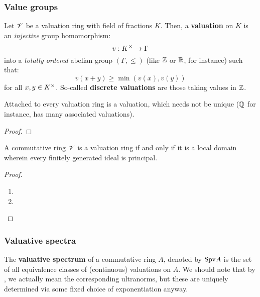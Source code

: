             \subsubsection{Value groups}
                \begin{definition}[Valuations] \label{def: valuations}
                    Let $\mathscr{V}$ be a valuation ring with field of fractions $K$. Then, a \textbf{valuation} on $K$ is an \textit{injective} group homomorphism:
                        $$v: K^{\x} \to \Gamma$$
                    into a \textit{totally ordered} abelian group $(\Gamma, \leq)$ (like $\mathbb{Z}$ or $\mathbb{R}$, for instance) such that:
                        $$v(x + y) \geq \min(v(x), v(y))$$
                    for all $x, y \in K^{\x}$. So-called \textbf{discrete valuations} are those taking values in $\mathbb{Z}$. 
                \end{definition}
                
                \begin{lemma}
                    Attached to every valuation ring is a valuation, which needs not be unique ($\mathbb{Q}$ for instance, has many associated valuations). 
                \end{lemma}
                    \begin{proof}
                        
                    \end{proof}
                \begin{theorem} \label{theorem: principality_and_locality_of_valuation rings}
                    A commutative ring $\mathscr{V}$ is a valuation ring if and only if it is a local domain wherein every finitely generated ideal is principal.
                \end{theorem}
                    \begin{proof}
                        \noindent
                        \begin{enumerate}
                            \item  
                            \item 
                        \end{enumerate}
                    \end{proof}
                    
            \subsubsection{Valuative spectra}
                \begin{definition} \label{def: valuative_spectra}
                    The \textbf{valuative spectrum} of a commutative ring $A$, denoted by $\mathrm{Spv} A$ is the set of all equivalence classes of (continuous) valuations on $A$. We should note that by , we actually mean the corresponding ultranorms, but these are uniquely determined via some fixed choice of exponentiation anyway.
                \end{definition}
                
